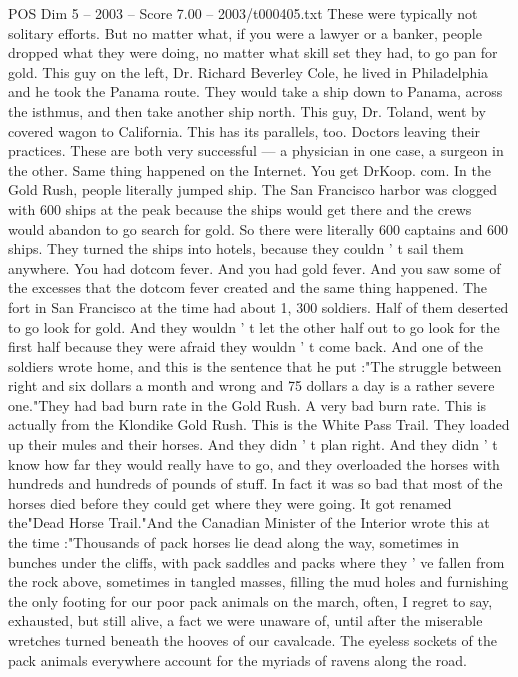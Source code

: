 \begin{textsample}{POS Dim 5 – 2003 – Score 7.00 – 2003/t000405.txt}
These were typically not solitary efforts.
But no matter what, if you were a lawyer or a banker, people dropped what they were doing, no matter what skill set they had, to go pan for gold.
This guy on the left, Dr.
Richard Beverley Cole, he lived in Philadelphia and he took the Panama route.
They would take a ship down to Panama, across the isthmus, and then take another ship north.
This guy, Dr.
Toland, went by covered wagon to California.
This has its parallels, too.
Doctors leaving their practices.
These are both very successful — a physician in one case, a surgeon in the other.
Same thing happened on the Internet.
You get DrKoop. com.
In the Gold Rush, people literally jumped ship.
The San Francisco harbor was clogged with 600 ships at the peak because the ships would get there and the crews would abandon to go search for gold.
So there were literally 600 captains and 600 ships.
They turned the ships into hotels, because they couldn ' t sail them anywhere.
You had dotcom fever.
And you had gold fever.
And you saw some of the excesses that the dotcom fever created and the same thing happened.
The fort in San Francisco at the time had about 1, 300 soldiers.
Half of them deserted to go look for gold.
And they wouldn ' t let the other half out to go look for the first half because they were afraid they wouldn ' t come back.
And one of the soldiers wrote home, and this is the sentence that he put :"The struggle between right and six dollars a month and wrong and 75 dollars a day is a rather severe one."They had bad burn rate in the Gold Rush.
A very bad burn rate.
This is actually from the Klondike Gold Rush.
This is the White Pass Trail.
They loaded up their mules and their horses.
And they didn ' t plan right.
And they didn ' t know how far they would really have to go, and they overloaded the horses with hundreds and hundreds of pounds of stuff.
In fact it was so bad that most of the horses died before they could get where they were going.
It got renamed the"Dead Horse Trail."And the Canadian Minister of the Interior wrote this at the time :"Thousands of pack horses lie dead along the way, sometimes in bunches under the cliffs, with pack saddles and packs where they ' ve fallen from the rock above, sometimes in tangled masses, filling the mud holes and furnishing the only footing for our poor pack animals on the march, often, I regret to say, exhausted, but still alive, a fact we were unaware of, until after the miserable wretches turned beneath the hooves of our cavalcade.
The eyeless sockets of the pack animals everywhere account for the myriads of ravens along the road.

\end{textsample}
